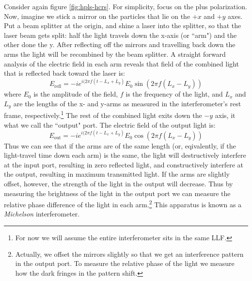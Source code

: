 Consider again figure \ref{fig:hpls-hcrs}. For simplicity, focus on the plus polarization. Now, imagine we stick a mirror on the particles that lie on the $+x$ and $+y$ axes. Put a beam splitter at the origin, and shine a laser into the splitter, so that the laser beam gets split: half the light travels down the x-axis (or ``arm") and the other done the y. After reflecting off the mirrors and travelling back down the arms the light will be recombined by the beam splitter. A straight forward analysis of the electric field in each arm \cite{ref:Saulson} reveals that field of the combined light that is reflected back toward the laser is:
\begin{equation}
E_{\mathrm{refl}} = -i e^{i(2\pi f( t - L_x + L_y )}E_0\sin(2\pi f(L_x - L_y))
\end{equation}
where $E_0$ is the amplitude of the field, $f$ is the frequency of the light, and $L_x$ and $L_y$ are the lengths of the x- and y-arms as measured in the interferometer's rest frame, respectively.\footnote{For now we will assume the entire interferometer sits in the same \ac{LLF}.} The rest of the combined light exits down the $-y$ axis, it what we call the ``output" port. The electric field of the output light is:
\begin{equation}
E_{\mathrm{out}} = -i e^{i(2\pi f( t - L_x + L_y )}E_0\cos(2\pi f(L_x - L_y))
\end{equation}
Thus we can see that if the arms are of the same length (or, eqivalently, if the light-travel time down each arm) is the same, the light will destructively interfere at the input port, resulting in zero reflected light, and constructively interfere at the output, resulting in maximum transmitted light. If the arms are slightly offset, however, the strength of the light in the output will decrease. Thus by measuring the brightness of the light in the output port we can measure the relative phase difference of the light in each arm.\footnote{Actually, we offset the mirrors slightly so that we get an interference pattern in the output port. To measure the relative phase of the light we measure how the dark fringes in the pattern shift.} This apparatus is known as a \emph{Michelson} interferometer.

